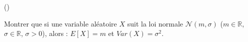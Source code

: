 \begin{exercice}\label{exo4-9} (\boringexo)

Montrer que si une variable al\'eatoire $X$ suit la loi normale $\mathcal{N} (m,\sigma)$ ($m \in \mathbb{R}$, $\sigma \in \mathbb{R}$, $\sigma > 0$), alors : $E[X] = m$ et $Var(X) = \sigma^2$.\\

\end{exercice}
